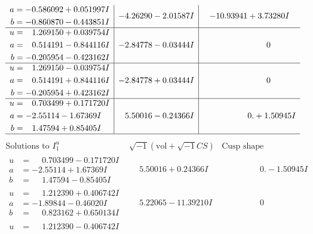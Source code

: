 \documentclass[1p]{elsarticle_modified}
\theoremstyle{definition}
\newcommand{\I}{\sqrt{-1}}
\begin{document}
$$\begin{array}{c|c|c}
\begin{aligned}
a &= -0.586092 + 0.051997 I \\
b &= -0.860870 - 0.443851 I\end{aligned}
 & -4.26290 - 2.01587 I & -10.93941 + 3.73280 I \\ \hline\begin{aligned}
u &= \phantom{-}1.269150 + 0.039754 I \\
a &= \phantom{-}0.514191 - 0.844116 I \\
b &= -0.205954 - 0.423162 I\end{aligned}
 & -2.84778 - 0.03444 I & \phantom{-0.000000 } 0 \\ \hline\begin{aligned}
u &= \phantom{-}1.269150 - 0.039754 I \\
a &= \phantom{-}0.514191 + 0.844116 I \\
b &= -0.205954 + 0.423162 I\end{aligned}
 & -2.84778 + 0.03444 I & \phantom{-0.000000 } 0 \\ \hline\begin{aligned}
u &= \phantom{-}0.703499 + 0.171720 I \\
a &= -2.55114 - 1.67369 I \\
b &= \phantom{-}1.47594 + 0.85405 I\end{aligned}
 & \phantom{-}5.50016 - 0.24366 I & \phantom{-0.000000 -}0. + 1.50945 I\\
 \hline 
 \end{array}$$\newpage$$\begin{array}{c|c|c}  
\text{Solutions to }I^u_{1}& \I (\text{vol} + \sqrt{-1}CS) & \text{Cusp shape}\\
 \hline 
\begin{aligned}
u &= \phantom{-}0.703499 - 0.171720 I \\
a &= -2.55114 + 1.67369 I \\
b &= \phantom{-}1.47594 - 0.85405 I\end{aligned}
 & \phantom{-}5.50016 + 0.24366 I & \phantom{-0.000000 } 0. - 1.50945 I \\ \hline\begin{aligned}
u &= \phantom{-}1.212390 + 0.406742 I \\
a &= -1.89844 - 0.46020 I \\
b &= \phantom{-}0.823162 + 0.650134 I\end{aligned}
 & \phantom{-}5.22065 - 11.39210 I & \phantom{-0.000000 } 0 \\ \hline\begin{aligned}
u &= \phantom{-}1.212390 - 0.406742 I \\

\end{aligned}
\end{array}$$
\end{document}
